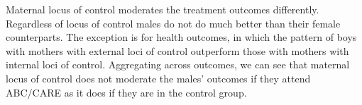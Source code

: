Maternal locus of control moderates the treatment outcomes differently. Regardless of locus of control males do not do much better than their female counterparts. The exception is for health outcomes, in which the pattern of boys with mothers with external loci of control outperform those with mothers with internal loci of control. Aggregating across outcomes, we can see that maternal locus of control does not moderate the males' outcomes if they attend ABC/CARE as it does if they are in the control group. 



